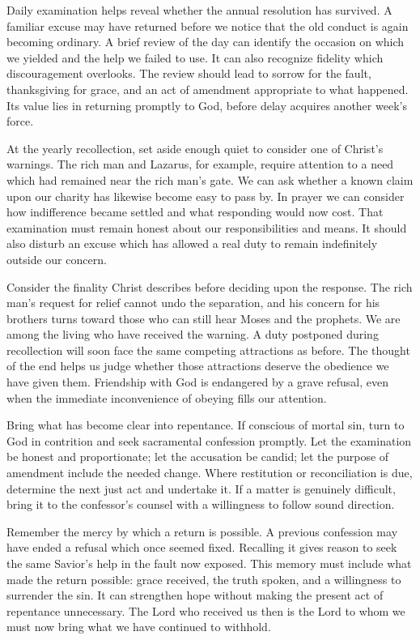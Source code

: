Daily examination helps reveal whether the annual resolution has survived. A familiar excuse may have returned before we notice that the old conduct is again becoming ordinary. A brief review of the day can identify the occasion on which we yielded and the help we failed to use. It can also recognize fidelity which discouragement overlooks. The review should lead to sorrow for the fault, thanksgiving for grace, and an act of amendment appropriate to what happened. Its value lies in returning promptly to God, before delay acquires another week's force.

At the yearly recollection, set aside enough quiet to consider one of Christ's warnings. The rich man and Lazarus, for example, require attention to a need which had remained near the rich man's gate. We can ask whether a known claim upon our charity has likewise become easy to pass by. In prayer we can consider how indifference became settled and what responding would now cost. That examination must remain honest about our responsibilities and means. It should also disturb an excuse which has allowed a real duty to remain indefinitely outside our concern.

Consider the finality Christ describes before deciding upon the response. The rich man's request for relief cannot undo the separation, and his concern for his brothers turns toward those who can still hear Moses and the prophets. We are among the living who have received the warning. A duty postponed during recollection will soon face the same competing attractions as before. The thought of the end helps us judge whether those attractions deserve the obedience we have given them. Friendship with God is endangered by a grave refusal, even when the immediate inconvenience of obeying fills our attention.

Bring what has become clear into repentance. If conscious of mortal sin, turn to God in contrition and seek sacramental confession promptly. Let the examination be honest and proportionate; let the accusation be candid; let the purpose of amendment include the needed change. Where restitution or reconciliation is due, determine the next just act and undertake it. If a matter is genuinely difficult, bring it to the confessor's counsel with a willingness to follow sound direction.

Remember the mercy by which a return is possible. A previous confession may have ended a refusal which once seemed fixed. Recalling it gives reason to seek the same Savior's help in the fault now exposed. This memory must include what made the return possible: grace received, the truth spoken, and a willingness to surrender the sin. It can strengthen hope without making the present act of repentance unnecessary. The Lord who received us then is the Lord to whom we must now bring what we have continued to withhold.


